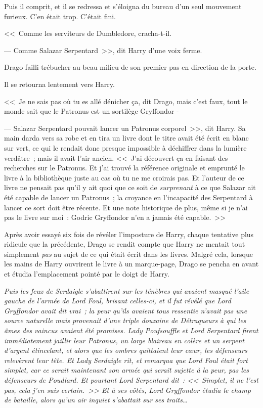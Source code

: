 Puis il comprit, et il se redressa et s'éloigna du bureau d'un seul mouvement furieux. C'en était trop. C'était fini.

<<~Comme les serviteurs de Dumbledore, cracha-t-il.

--- Comme Salazar Serpentard~>>, dit Harry d'une voix ferme.

Drago failli trébucher au beau milieu de son premier pas en direction de la porte.

Il se retourna lentement vers Harry.

<<~Je ne sais pas où tu es allé dénicher ça, dit Drago, mais c'est faux, tout le monde sait que le Patronus est un sortilège Gryffondor -

--- Salazar Serpentard pouvait lancer un Patronus corporel~>>, dit Harry. Sa main darda vers sa robe et en tira un livre dont le titre avait été écrit en blanc sur vert, ce qui le rendait donc presque impossible à déchiffrer dans la lumière verdâtre~; mais il avait l'air ancien. <<~J'ai découvert ça en faisant des recherches sur le Patronus. Et j'ai trouvé la référence originale et emprunté le livre à la bibliothèque juste au cas où tu ne me croirais pas. Et l'auteur de ce livre ne pensait pas qu'il y ait quoi que ce soit de \emph{surprenant} à ce que Salazar ait été capable de lancer un Patronus~; la croyance en l'incapacité des Serpentard à lancer ce sort doit être récente. Et une note historique de plus, même si je n'ai pas le livre sur moi~: Godric Gryffondor n'en a jamais été capable.~>>

Après avoir essayé six fois de révéler l'imposture de Harry, chaque tentative plus ridicule que la précédente, Drago se rendit compte que Harry ne mentait tout simplement \emph{pas} au sujet de ce qui était écrit dans les livres. Malgré cela, lorsque les mains de Harry ouvrirent le livre à un marque-page, Drago se pencha en avant et étudia l'emplacement pointé par le doigt de Harry.

\emph{Puis les feux de Serdaigle s'abattirent sur les ténèbres qui avaient masqué l'aile gauche de l'armée de Lord Foul, brisant celles-ci, et il fut révélé que Lord Gryffondor avait dit vrai~; la peur qu'ils avaient tous ressentie n'avait pas une source naturelle mais provenait d'une triple douzaine de Détraqueurs à qui les âmes des vaincus avaient été promises. Lady Poufsouffle et Lord Serpentard firent immédiatement jaillir leur Patronus, un large blaireau en colère et un serpent d'argent étincelant, et alors que les ombres quittaient leur cœur, les défenseurs relevèrent leur tête. Et Lady Serdaigle rit, et remarqua que Lord Foul était fort simplet, car ce serait maintenant son armée qui serait sujette à la peur, pas les défenseurs de Poudlard. Et pourtant Lord Serpentard dit~: <<~Simplet, il ne l'est pas, cela j'en suis certain.~>> Et à ses côtés, Lord Gryffondor étudia le champ de bataille, alors qu'un air inquiet s'abattait sur ses traits…}

